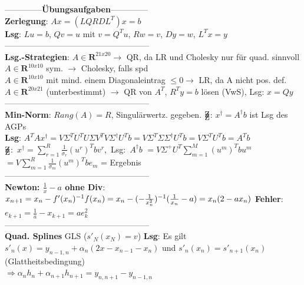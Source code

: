 --------------\textbf{Übungsaufgaben}--------------\\
\textbf{Zerlegung}: $Ax = (LQRDL^T)x = b$\\
\textbf{Lsg}: $Lu = b$, $Qv = u$ mit $v = Q^Tu$, $Rw = v$, $Dy = w$, $L^Tx = y$\\
-----------------------------------------------------\\
\textbf{Lsg.-Strategien}: $A \in \mathbf{R}^{21x20} \rightarrow$ QR,
da LR und Cholesky nur für quad. sinnvoll\\
$A \in \mathbf{R}^{10x10}$ sym. $\rightarrow$ Cholesky, falls spd\\
$A \in \mathbf{R}^{10x10}$ mit mind. einem Diagonaleintrag $\leq 0 \rightarrow$ LR, da A nicht pos. def.\\
$A \in \mathbf{R}^{20x21}$ (unterbestimmt) $\rightarrow$ QR von $A^T$, $R^Ty = b$ lösen (VwS), Lsg: $x = Qy$\\
-----------------------------------------------------\\
\textbf{Min-Norm}: $Rang(A) = R$, Singulärwertz. gegeben. $\mathrm{Z\kern-.6em\raise-0.7ex\hbox{Z}}$: $ x^{\dagger} = A^{\dagger}b$ ist Lsg des AGPs\\
\textbf{Lsg}: $A^TAx^{\dagger} = V \Sigma^T U^T U \Sigma V^T V \Sigma^{\dagger} U^T b = V \Sigma^T \Sigma \Sigma^{\dagger} U^T b = V \Sigma^T U^T b = A^T b$\\
\mbox{$\mathrm{Z\kern-.6em\raise-0.7ex\hbox{Z}}$: $ x^{\dagger} = \sum_{r=1}^R \frac{1}{\sigma_r}(u^r)^Tbv^r$, Lsg: $A^{\dagger}b$} $= V \Sigma^{+}U^T \sum_{m=1}^M (u^m)^T b u^m$\\
$= V \sum_{m=1}^R \frac{1}{\sigma_m} (u^m)^T b e_m$ = Ergebnis\\
-----------------------------------------------------\\
\textbf{Newton: $\frac{1}{x} - a$ ohne Div}: $x_{n+1} = x_n \\- f'(x_n)^{-1} f(x_n) = x_n - (-\frac{1}{x_n^2})^{-1}(\frac{1}{x_n} - a) = x_n(2 - ax_n)$ \textbf{Fehler}: $e_{k+1} = \frac{1}{a} - x_{k+1} = ae_k^2$\\
-----------------------------------------------------\\
\textbf{Quad. Splines} GLS ($s'_N(x_N) = v$) \textbf{Lsg}: Es gilt $s'_n(x) = y_{n-1,n} + \alpha_n(2x - x_{n-1} - x_n)$ und $s'_n(x_n) = s'_{n+1}(x_n)$ (Glattheitsbedingung) \\ 
$\Rightarrow \alpha_n h_n + \alpha_{n+1} h_{n+1} = y_{n,n + 1} - y_{n-1, n}$\\
